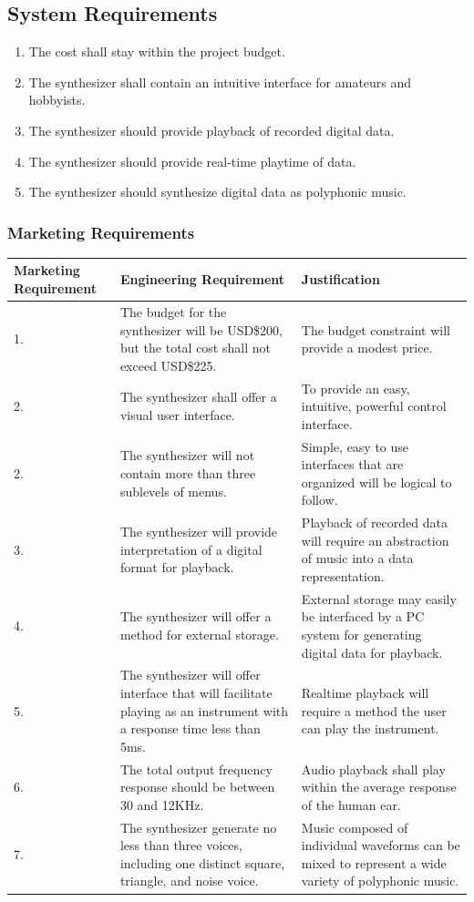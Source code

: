 \documentclass[abstract=on,paper=a4, fontsize=12pt]{scrartcl}		%
\begin{document}
  \subsection{System Requirements}
    \begin{enumerate}
      \item The cost shall stay within the project budget.
      \item The synthesizer shall contain an intuitive interface for amateurs and hobbyists.
      \item The synthesizer should provide playback of recorded digital data.
      \item The synthesizer should provide real-time playtime of data.
      \item The synthesizer should synthesize digital data as polyphonic music.
    \end{enumerate}
    \subsubsection{Marketing Requirements}
      \begin{tabular}{|p{2.0cm}|p{4cm}|p{6cm}|}
          \hline
        Marketing Requirement & Engineering Requirement & Justification \\
          \hline
        1. & The budget for the synthesizer will be USD\$200, but the total cost shall not exceed USD\$225. & The budget constraint will provide a modest price.\\
          \hline
        2. & The synthesizer shall offer a visual user interface. & To provide an easy, intuitive, powerful control interface.\\
          \hline
        2. & The synthesizer will not contain more than three sublevels of menus. & Simple, easy to use interfaces that are organized will be logical to follow.\\
          \hline
        3. & The synthesizer will provide interpretation of a digital format for playback. & Playback of recorded data will require an abstraction of  music into a data representation.\\
          \hline
        4. & The synthesizer will offer a method for external storage. & External storage may easily be interfaced by a PC system for generating digital data for playback.\\
          \hline
        5. & The synthesizer will offer interface that will facilitate playing as an instrument with a response time less than 5ms. & Realtime playback will require a method the user can play the instrument.\\
          \hline
        6. & The total output frequency response should be between 30 and 12KHz. & Audio playback shall play within the average response of the human ear.\\
          \hline
        7. & The synthesizer generate no less than three voices, including one distinct square, triangle, and noise voice. & Music composed of individual waveforms can be mixed to represent a wide variety of polyphonic music.\\
          \hline
      \end{tabular}
\end{document}
